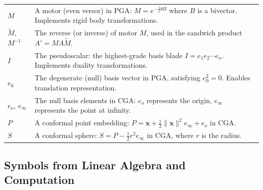 \documentclass[manuscript, nonacm, review=false]{acmart}
\theoremstyle{definition}
\theoremstyle{plain}
\begin{document}
\begin{longtable}{@{}p{2.8cm}p{10cm}@{}}
$M$ & A motor (even versor) in PGA: $M = e^{-\frac{1}{2}\theta B}$ where $B$ is a bivector. Implements rigid body transformations. \\

$\widetilde{M}$, $M^{-1}$ & The reverse (or inverse) of motor $M$, used in the sandwich product $A' = M A \widetilde{M}$. \\

$I$ & The pseudoscalar: the highest-grade basis blade $I = e_1 e_2 \cdots e_n$. Implements duality transformations. \\

$e_0$ & The degenerate (null) basis vector in PGA, satisfying $e_0^2 = 0$. Enables translation representation. \\

$e_o$, $e_\infty$ & The null basis elements in CGA: $e_o$ represents the origin, $e_\infty$ represents the point at infinity. \\

$P$ & A conformal point embedding: $P = \mathbf{x} + \frac{1}{2}\|\mathbf{x}\|^2 e_\infty + e_o$ in CGA. \\

$S$ & A conformal sphere: $S = P - \frac{1}{2}r^2 e_\infty$ in CGA, where $r$ is the radius. \\

\end{longtable}


\subsection{Symbols from Linear Algebra and Computation}
\label{subsec:symbols_linalg}
\end{document}
